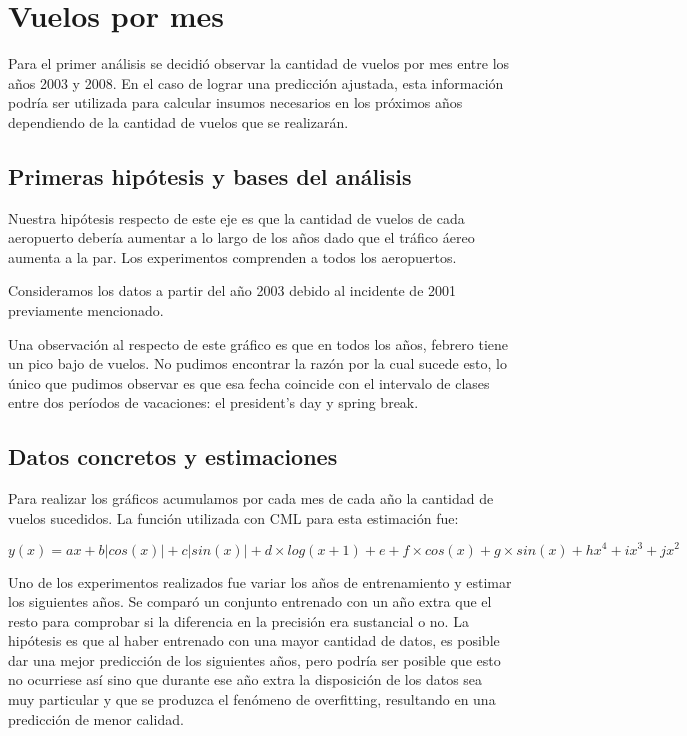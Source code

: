 \section{Vuelos por mes}

Para el primer análisis se decidió observar la cantidad de vuelos por mes entre los años 2003 y 2008. En el caso de lograr una predicción ajustada, esta información podría ser utilizada para calcular insumos necesarios en los próximos años dependiendo de la cantidad de vuelos que se realizarán.

\subsection{Primeras hipótesis y bases del análisis}

Nuestra hipótesis respecto de este eje es que la cantidad de vuelos de cada aeropuerto debería aumentar a lo largo de los años dado que el tráfico áereo aumenta a la par. Los experimentos comprenden a todos los aeropuertos.

Consideramos los datos a partir del año 2003 debido al incidente de 2001 previamente mencionado.

Una observación al respecto de este gráfico es que en todos los años, febrero tiene un pico bajo de vuelos. No pudimos encontrar la razón por la cual sucede esto, lo único que pudimos observar es que esa fecha coincide con el intervalo de clases entre dos períodos de vacaciones: el president’s day y spring break.

\subsection{Datos concretos y estimaciones}

Para realizar los gráficos acumulamos por cada mes de cada año la cantidad de vuelos sucedidos. La función utilizada con CML para esta estimación fue:

\smallskip

$y(x) = ax + b|cos(x)| + c|sin(x)| + d \times log(x+1) + e + f \times cos(x) + g \times sin(x) + hx^4 + ix^3 + jx^2$

Uno de los experimentos realizados fue variar los años de entrenamiento y estimar los siguientes años. Se comparó un conjunto entrenado con un año extra que el resto para comprobar si la diferencia en la precisión era sustancial o no. La hipótesis es que al haber entrenado con una mayor cantidad de datos, es posible dar una mejor predicción de los siguientes años, pero podría ser posible que esto no ocurriese así sino que durante ese año extra la disposición de los datos sea muy particular y que se produzca el fenómeno de overfitting, resultando en una predicción de menor calidad.

